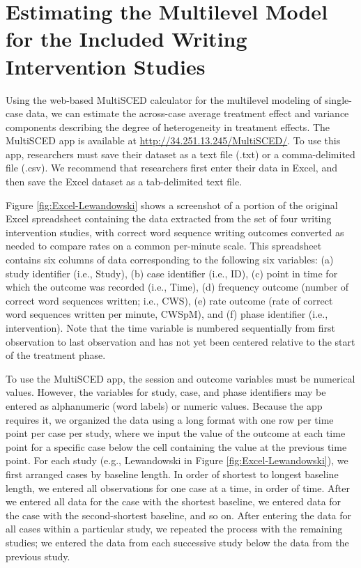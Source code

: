 \documentclass[
]{book}
\begin{document}
\hypertarget{estimating-the-multilevel-model-for-the-included-writing-intervention-studies}{%
\section{Estimating the Multilevel Model for the Included Writing Intervention Studies}\label{estimating-the-multilevel-model-for-the-included-writing-intervention-studies}}

Using the web-based MultiSCED calculator for the multilevel modeling of single-case data, we can estimate the across-case average treatment effect and variance components describing the degree of heterogeneity in treatment effects. The MultiSCED app is available at \url{http://34.251.13.245/MultiSCED/}. To use this app, researchers must save their dataset as a text file (.txt) or a comma-delimited file (.csv). We recommend that researchers first enter their data in Excel, and then save the Excel dataset as a tab-delimited text file.

Figure \ref{fig:Excel-Lewandowski} shows a screenshot of a portion of the original Excel spreadsheet containing the data extracted from the set of four writing intervention studies, with correct word sequence writing outcomes converted as needed to compare rates on a common per-minute scale. This spreadsheet contains six columns of data corresponding to the following six variables: (a) study identifier (i.e., Study), (b) case identifier (i.e., ID), (c) point in time for which the outcome was recorded (i.e., Time), (d) frequency outcome (number of correct word sequences written; i.e., CWS), (e) rate outcome (rate of correct word sequences written per minute, CWSpM), and (f) phase identifier (i.e., intervention). Note that the time variable is numbered sequentially from first observation to last observation and has not yet been centered relative to the start of the treatment phase.

To use the MultiSCED app, the session and outcome variables must be numerical values. However, the variables for study, case, and phase identifiers may be entered as alphanumeric (word labels) or numeric values. Because the app requires it, we organized the data using a long format with one row per time point per case per study, where we input the value of the outcome at each time point for a specific case below the cell containing the value at the previous time point. For each study (e.g., Lewandowski in Figure \ref{fig:Excel-Lewandowski}), we first arranged cases by baseline length. In order of shortest to longest baseline length, we entered all observations for one case at a time, in order of time. After we entered all data for the case with the shortest baseline, we entered data for the case with the second-shortest baseline, and so on. After entering the data for all cases within a particular study, we repeated the process with the remaining studies; we entered the data from each successive study below the data from the previous study.
\end{document}
